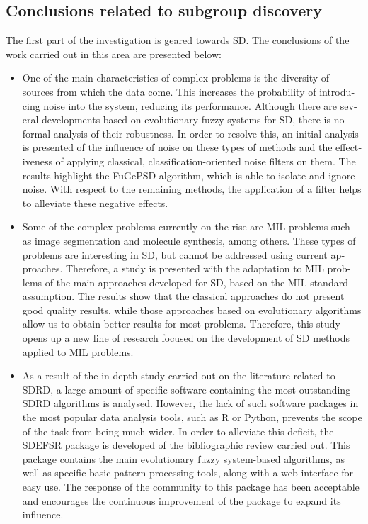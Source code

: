 \documentclass[c5paper,10pt,twoside]{book}	   	%
\begin{document}
\begin{otherlanguage}{british}
\section{Conclusions related to subgroup discovery}

The first part of the investigation is geared towards \ac{SD}. The conclusions of the work carried out in this area are presented below:

\begin{itemize}
	\item One of the main characteristics of complex problems is the diversity of sources from which the data come. This increases the probability of introducing noise into the system, reducing its performance. Although there are several developments based on evolutionary fuzzy systems for \ac{SD}, there is no formal analysis of their robustness. In order to resolve this, an initial analysis is presented of the influence of noise on these types of methods and the effectiveness of applying classical, classification-oriented noise filters on them. The results highlight the FuGePSD algorithm, which is able to isolate and ignore noise. With respect to the remaining methods, the application of a filter helps to alleviate these negative effects. 
	
	\item Some of the complex problems currently on the rise are \ac{MIL} problems such as image segmentation and molecule synthesis, among others. These types of problems are interesting in \ac{SD}, but cannot be addressed using current approaches. Therefore, a study is presented with the adaptation to \ac{MIL} problems of the main approaches developed for \ac{SD}, based on the \ac{MIL} standard assumption. The results show that the classical approaches do not present good quality results, while those approaches based on evolutionary algorithms allow us to obtain better results for most problems. Therefore, this study opens up a new line of research focused on the development of \ac{SD} methods applied to \ac{MIL} problems.
	
	\item As a result of the in-depth study carried out on the literature related to SDRD, a large amount of specific software containing the most outstanding SDRD algorithms is analysed. However, the lack of such software packages in the most popular data analysis tools, such as R or Python, prevents the scope of the task from being much wider. In order to alleviate this deficit, the SDEFSR package is developed of the bibliographic review carried out. This package contains the main evolutionary fuzzy system-based algorithms, as well as specific basic pattern processing tools, along with a web interface for easy use. The response of the community to this package has been acceptable and encourages the continuous improvement of the package to expand its influence.
\end{itemize}


\end{otherlanguage}
\end{document}
